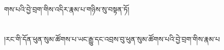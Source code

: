 གས་པའི་བྱེ་བྲག་གིས་འདིར་རྣམ་པ་གཉིས་སུ་བསྟན་ཏོ།\chapter{ }།རང་གི་དོན་ཕུན་སུམ་ཚོགས་པ་ཡང་རྒྱུ་དང་འབྲས་བུ་ཕུན་སུམ་ཚོགས་པའི་བྱེ་བྲག་གིས་རྣམ་པ